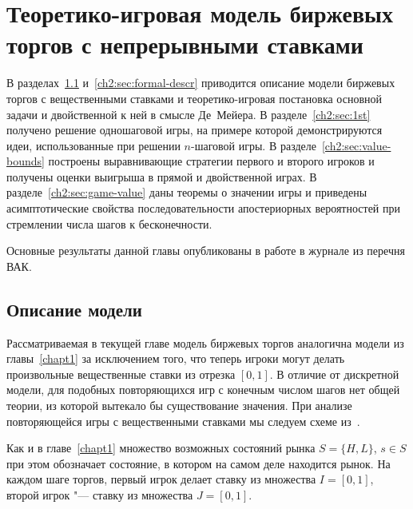 \chapter{Теоретико-игровая модель биржевых торгов с непрерывными ставками} \label{chapt2}%
{
\newcommand{\Port}[1]{y_{#1}}
\newcommand*\dualFPS{\ensuremath{(p,\ \sigma)}}
\dualg[4][1=n, 2={\dualFPS}, 3=x, 4=\tau]{\ensuremath{g^*_{#1}(#3, #2, #4)}}

В разделах~\ref{ch2:sec:model-descr} и~\ref{ch2:sec:formal-descr} приводится описание модели биржевых торгов с вещественными ставками и теоретико-игровая постановка основной задачи и двойственной к ней в смысле Де~Мейера.
В разделе~\ref{ch2:sec:1st} получено решение одношаговой игры, на примере которой демонстрируются идеи, использованные при решении $n$-шаговой игры.
В разделе~\ref{ch2:sec:value-bounds} построены выравнивающие стратегии первого и второго игроков и получены оценки выигрыша в прямой и двойственной играх.
В разделе~\ref{ch2:sec:game-value} даны теоремы о значении игры и приведены асимптотические свойства последовательности апостериорных вероятностей при стремлении числа шагов к бесконечности.

Основные результаты данной главы опубликованы в работе \cite{pyanykh16:cont} в журнале из перечня ВАК.

\section{Описание модели}
\label{ch2:sec:model-descr}

Рассматриваемая в текущей главе модель биржевых торгов аналогична модели из главы~\ref{chapt1} за исключением того, что теперь игроки могут делать произвольные вещественные ставки из отрезка $[0, 1]$.
В отличие от дискретной модели, для подобных повторяющихся игр с конечным числом шагов нет общей теории, из которой вытекало бы существование значения.
При анализе повторяющейся игры с вещественными ставками мы следуем схеме из~\cite{demeyer02c}.

Как и в главе~\ref{chapt1} множество возможных состояний рынка $S = \{H, L\}$, $s \in S$ при этом обозначает состояние, в котором на самом деле находится рынок.
На каждом шаге торгов, первый игрок делает ставку из множества $I = [0, 1]$, второй игрок "--- ставку из множества $J = [0,1]$.

}
